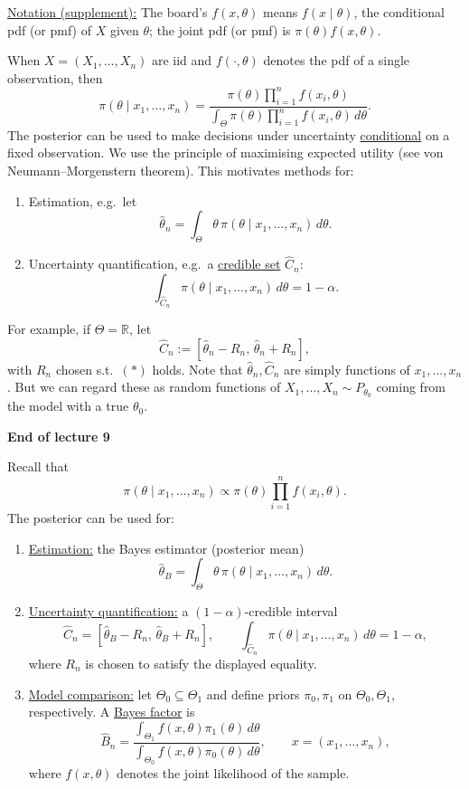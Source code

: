 \documentclass[11pt,a4paper]{article}
\begin{document}
\noindent\underline{Notation (supplement):}\quad
The board's $f(x,\theta)$ means $f(x\mid\theta)$, the conditional pdf
(or pmf) of $X$ given $\theta$; the joint pdf (or pmf) is
$\pi(\theta)f(x,\theta)$.

When $X=(X_1,\ldots,X_n)$ are iid and $f(\cdot,\theta)$ denotes the pdf
of a single observation, then
\[
\pi(\theta\mid x_1,\ldots,x_n)=
\frac{\displaystyle\pi(\theta)\prod_{i=1}^n f(x_i,\theta)}
{\displaystyle\int_\Theta\pi(\theta)\prod_{i=1}^n f(x_i,\theta)\,d\theta}.
\]
The posterior can be used to make decisions under uncertainty
\underline{conditional} on a fixed observation.
We use the principle of maximising expected utility
(see von Neumann--Morgenstern theorem).
This motivates methods for:
\begin{enumerate}
\item Estimation, e.g.\ let
\[
\hat\theta_n=\int_\Theta\theta\,\pi(\theta\mid x_1,\ldots,x_n)\,d\theta.
\]
\item Uncertainty quantification, e.g.\ a \underline{credible set} $\hat C_n$:
\[
\int_{\hat C_n}\pi(\theta\mid x_1,\ldots,x_n)\,d\theta=1-\alpha.
\tag{$*$}
\]
\end{enumerate}
For example, if $\Theta=\mathbb R$, let
\[
\hat C_n:=[\hat\theta_n-R_n,\,\hat\theta_n+R_n],
\]
with $R_n$ chosen s.t.\ $(*)$ holds.
Note that $\hat\theta_n,\hat C_n$ are simply functions of $x_1,\ldots,x_n$.
But we can regard these as random functions of
$X_1,\ldots,X_n\sim P_{\theta_0}$ coming from the model with a true $\theta_0$.

\begin{center}
\textbf{End of lecture 9}
\end{center}

Recall that
\[
\pi(\theta\mid x_1,\ldots,x_n)
\propto\pi(\theta)\prod_{i=1}^n f(x_i,\theta).
\]
The posterior can be used for:
\begin{enumerate}
\item \underline{Estimation:} the Bayes estimator (posterior mean)
\[
\hat\theta_B=\int_\Theta\theta\,\pi(\theta\mid x_1,\ldots,x_n)\,d\theta.
\]
\item \underline{Uncertainty quantification:} a $(1-\alpha)$-credible interval
\[
\hat C_n=[\hat\theta_B-R_n,\,\hat\theta_B+R_n],
\qquad
\int_{\hat C_n}\pi(\theta\mid x_1,\ldots,x_n)\,d\theta=1-\alpha,
\]
where $R_n$ is chosen to satisfy the displayed equality.
\item \underline{Model comparison:} let $\Theta_0\subseteq\Theta_1$ and
define priors $\pi_0,\pi_1$ on $\Theta_0,\Theta_1$, respectively.
A \underline{Bayes factor} is
\[
\hat B_n=
\frac{\displaystyle\int_{\Theta_1}f(x,\theta)\pi_1(\theta)\,d\theta}
{\displaystyle\int_{\Theta_0}f(x,\theta)\pi_0(\theta)\,d\theta},
\qquad x=(x_1,\ldots,x_n),
\]
where $f(x,\theta)$ denotes the joint likelihood of the sample.
\end{enumerate}
\end{document}
